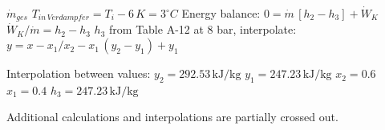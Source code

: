 \( \dot{m}_{ges} \)  
\( T_{in \, Verdampfer} = T_i - 6 \, K = 3^\circ C \)  
Energy balance:  
\( 0 = \dot{m} \, [h_2 - h_3] + \dot{W}_K \)  
\( \dot{W}_K / \dot{m} = h_2 - h_3 \)  
\( h_3 \) from Table A-12 at 8 bar, interpolate:  
\( y = x - x_1 / x_2 - x_1 \, (y_2 - y_1) + y_1 \)  

Interpolation between values:  
\( y_2 = 292.53 \, \text{kJ/kg} \)  
\( y_1 = 247.23 \, \text{kJ/kg} \)  
\( x_2 = 0.6 \)  
\( x_1 = 0.4 \)  
\( h_3 = 247.23 \, \text{kJ/kg} \)  

Additional calculations and interpolations are partially crossed out.